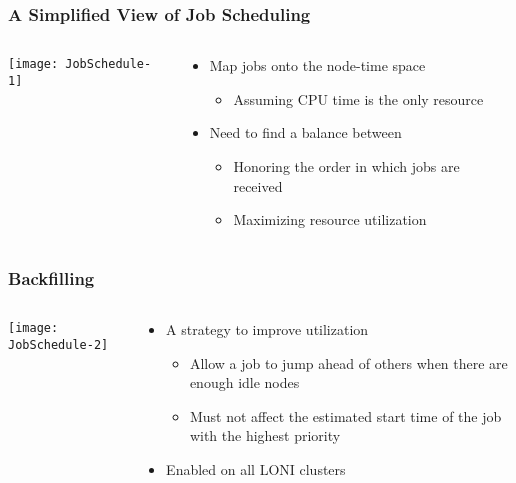 \documentclass[slidestop,mathserif,compress,xcolor=svgnames,table]{beamer}
\newenvironment{bblock}[0]
{
\begin{beamerboxesrounded}[upper=uppercol1,lower=lowercol1,shadow=true]}
{\end{beamerboxesrounded}}
\begin{document}
\begin{frame}
  \frametitle{\small A Simplified View of Job Scheduling}
  \begin{columns}
    \column{7cm}
    \vspace{-1cm}
    \begin{center}
      \texttt{[image: JobSchedule-1]}
    \end{center}
    \column{5cm}
    \vspace{-0.5cm}
    \begin{bblock}{}
      \begin{itemize}
	\item Map jobs onto the node-time space
	\begin{itemize}
	  \item Assuming CPU time is the only resource
	\end{itemize}
	\item Need to find a balance between
	\begin{itemize}
	  \item Honoring the order in which jobs are received
	  \item Maximizing resource utilization
	\end{itemize}
      \end{itemize}
    \end{bblock}
  \end{columns}
\end{frame}

\begin{frame}
  \frametitle{\small Backfilling}
  \begin{columns}
    \column{7cm}
    \vspace{-1cm}
    \begin{center}
      \texttt{[image: JobSchedule-2]}
    \end{center}
    \column{5cm}
    \vspace{-0.5cm}
    \begin{bblock}{}
      \begin{itemize}
	\item A strategy to improve utilization
	\begin{itemize}
	  \item Allow a job to jump ahead of others when there are enough idle nodes
	  \item Must not affect the estimated start time of the job with the highest priority
	\end{itemize}
	\item Enabled on all LONI clusters
      \end{itemize}
    \end{bblock}
  \end{columns}
\end{frame}
\end{document}
